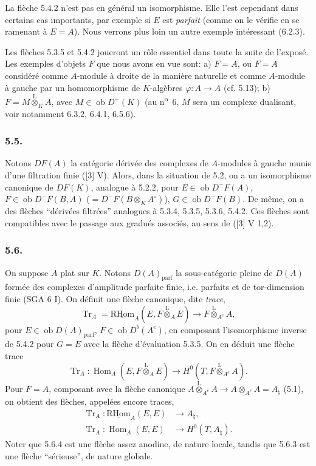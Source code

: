\documentclass[11pt]{article}
\DeclareMathOperator{\Hom}{Hom}
\newcommand{\R}{\mathrm{R}}\newcommand{\RHomCore}{\mathrm{RHom}}
\newcommand{\ob}{\operatorname{ob}}
\providecommand{\RHom}{\RHomCore}
\providecommand{\uRHom}{\underline{\RHom}}
\providecommand{\Tr}{\operatorname{Tr}}
\providecommand{\Tr}{\operatorname{Tr}}
\providecommand{\lten}{\overset{\mathrm L}{\otimes}}
\providecommand{\Tr}{\operatorname{Tr}}
\providecommand{\RHom}{\RHomCore}
\providecommand{\Hom}{\operatorname{Hom}}
\providecommand{\ob}{\operatorname{ob}}
\providecommand{\lten}{\overset{\mathrm L}{\otimes}}
\providecommand{\RHom}{\R\mathcal{H}om}
\providecommand{\lten}{\overset{\mathrm L}{\otimes}}
\providecommand{\R}{\mathrm R}
\providecommand{\Tr}{\operatorname{Tr}}
\providecommand{\lten}{\overset{\mathrm L}{\otimes}}
\providecommand{\lten}{\overset{\mathrm L}{\otimes}}
\providecommand{\lten}{\overset{\mathrm L}{\otimes}}
\providecommand{\RHom}{\RHomCore}
\providecommand{\Hom}{\operatorname{Hom}}
\providecommand{\Tr}{\operatorname{Tr}}
\providecommand{\lten}{\overset{\mathrm L}{\otimes}}
\begin{document}
La flèche 5.4.2 n'est pas en général un isomorphisme. Elle l'est cependant dans certains cas importants, par exemple si $E$ est \emph{parfait} (comme on le vérifie en se ramenant à $E=A$). Nous verrons plus loin un autre exemple intéressant (6.2.3).

Les flèches 5.3.5 et 5.4.2 joueront un rôle essentiel dans toute la suite de l'exposé. Les exemples d'objets $F$ que nous avons en vue sont: a) $F=A$, ou $F=A$ considéré comme $A$-module à droite de la manière naturelle et comme $A$-module à gauche par un homomorphisme de $K$-algèbres $\varphi:A\to A$ (cf. 5.13); b) $F=M\lten_KA$, avec $M\in\ob D^+(K)$ (au n\textsuperscript{o}~6, $M$ sera un complexe dualisant, voir notamment 6.3.2, 6.4.1, 6.5.6).

\subsubsection*{5.5.}

Notons $DF(A)$ la catégorie dérivée des complexes de $A$-modules à gauche munis d'une filtration finie ([3] V). Alors, dans la situation de 5.2, on a un isomorphisme canonique de $DF(K)$, analogue à 5.2.2, pour $E\in\ob D^-F(A)$, $F\in\ob D^-F(B,A)$ ($=D^-F(B\otimes_KA^\circ)$), $G\in\ob D^+F(B)$. De même, on a des flèches ``dérivées filtrées'' analogues à 5.3.4, 5.3.5, 5.3.6, 5.4.2. Ces flèches sont compatibles avec le passage aux gradués associés, au sens de ([3] V 1,2).

\subsubsection*{5.6.}

On suppose $A$ plat sur $K$. Notons $D(A)_{\mathrm{parf}}$ la sous-catégorie pleine de $D(A)$ formée des complexes d'amplitude parfaite finie, i.e. parfaits et de tor-dimension finie (SGA 6 I). On définit une flèche canonique, dite \emph{trace},
\begin{equation}\tag{5.6.1}
\Tr_A=\uRHom_A(E,F\lten_AE)\longrightarrow F\lten_{A^e}A,
\end{equation}
pour $E\in\ob D(A)_{\mathrm{parf}}$, $F\in\ob D^b(A^e)$, en composant l'isomorphisme inverse de 5.4.2 pour $G=E$ avec la flèche d'évaluation 5.3.5. On en déduit une flèche trace
\begin{equation}\tag{5.6.2}
\Tr_A:\Hom_A(E,F\lten_AE)\longrightarrow H^0(T,F\lten_{A^e}A).
\end{equation}
Pour $F=A$, composant avec la flèche canonique $A\lten_{A^e}A\to A\otimes_{A^e}A=A_\natural$ (5.1), on obtient des flèches, appelées encore traces,
\begin{align}
\Tr_A:\uRHom_A(E,E)&\longrightarrow A_\natural,\tag{5.6.3}\\
\Tr_A:\Hom_A(E,E)&\longrightarrow H^0(T,A_\natural).\tag{5.6.4}
\end{align}
Noter que 5.6.4 est une flèche assez anodine, de nature locale, tandis que 5.6.3 est une flèche ``sérieuse'', de nature globale.
\end{document}
